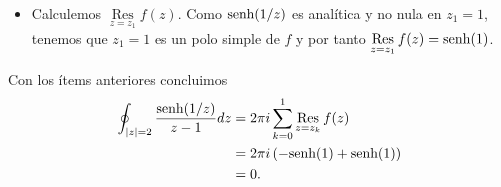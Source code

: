 {\begin{itemize}
        $$
        \begin{aligned}
           e-e^{-1}&=\left( \sum_{n=0}^{\infty}\frac{1}{n!}\right)\left( \sum_{n=0}^{\infty}\frac{(-1)^n}{n!}\right)\\
                   &=\sum_{n=0}^{\infty}\left( 1-(-1)^n\right)\frac{1}{n!}\\
                   &=\frac{2}{1!}+\frac{2}{3!}+\frac{2}{5!}+\dots\\
                   &=\sum_{n=0}^{\infty}\frac{2}{(2n+1)!},
        \end{aligned}
        $$
        y por tanto
        $$
        \frac{e-e^{-1}}{2}=\sum_{n=0}^{\infty}\frac{1}{(2n+1)!}.
        $$
        De lo anterior obtenemos
        $$
        \mathop{\mathrm{Res}}\limits_{z=z_0}f(z)=-\frac{e-e^{-1}}{2}=-\senh (1).
        $$
     \item Calculemos $\mathop{\mathrm{Res}}\limits_{z=z_1}f(z)$. Como $\normalfont{\text{senh}} (1/z)$ es analítica y no nula en $z_1=1$, tenemos que $z_1=1$ es un polo simple de $f$ y por tanto $\mathop{\mathrm{Res}}\limits_{z=z_1}f(z)=\normalfont{\text{senh}} (1)$.
  \end{itemize}
  Con los ítems anteriores concluimos
  $$
  \begin{aligned}
     \oint _{|z|=2}\frac{\normalfont{\text{senh}} (1/z)}{z-1}dz&=2\pi i \sum_{k=0}^{1}\mathop{\mathrm{Res}}\limits_{z=z_k}f(z)\\
                                            &=2\pi i\left( -\normalfont{\text{senh}}(1)+\normalfont{\text{senh}}(1)\right)\\
                                            &=0.
  \end{aligned}
  $$
}
\hfill\qedsymbol
